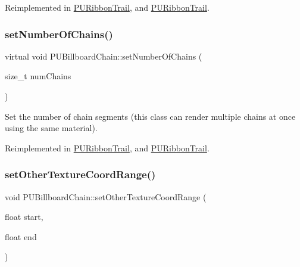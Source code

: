 Reimplemented in \hyperlink{classPURibbonTrail_a13906fbe3daa9f8b198fa95308dc30fb}{P\+U\+Ribbon\+Trail}, and \hyperlink{classPURibbonTrail_a73dff6c67263bc49678ce73a16d03756}{P\+U\+Ribbon\+Trail}.

\mbox{\label{classPUBillboardChain_ab249ea9d3b16541744335723f21634c3}} 
\subsubsection{\texorpdfstring{set\+Number\+Of\+Chains()}{setNumberOfChains()}\hspace{0.1cm}{\footnotesize\ttfamily [2/2]}}
{\footnotesize\ttfamily virtual void P\+U\+Billboard\+Chain\+::set\+Number\+Of\+Chains (\begin{DoxyParamCaption}\item[{size\+\_\+t}]{num\+Chains }\end{DoxyParamCaption})\hspace{0.3cm}{\ttfamily [virtual]}}

Set the number of chain segments (this class can render multiple chains at once using the same material). 

Reimplemented in \hyperlink{classPURibbonTrail_a13906fbe3daa9f8b198fa95308dc30fb}{P\+U\+Ribbon\+Trail}, and \hyperlink{classPURibbonTrail_a73dff6c67263bc49678ce73a16d03756}{P\+U\+Ribbon\+Trail}.

\mbox{\label{classPUBillboardChain_ae71162178b5886a93297766ea44079c4}} 
\subsubsection{\texorpdfstring{set\+Other\+Texture\+Coord\+Range()}{setOtherTextureCoordRange()}\hspace{0.1cm}{\footnotesize\ttfamily [1/2]}}
{\footnotesize\ttfamily void P\+U\+Billboard\+Chain\+::set\+Other\+Texture\+Coord\+Range (\begin{DoxyParamCaption}\item[{float}]{start,  }\item[{float}]{end }\end{DoxyParamCaption})\hspace{0.3cm}{\ttfamily [virtual]}}

